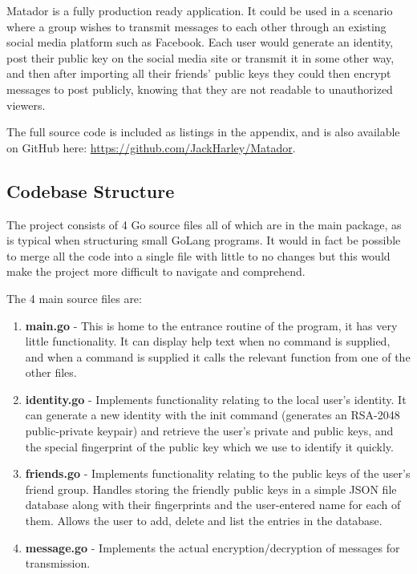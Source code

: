 \documentclass{article}[12pt]
\begin{document}
		Matador is a fully production ready application. It could be used in a scenario where a group wishes to transmit messages to each other through an existing social media platform such as Facebook. Each user would generate an identity, post their public key on the social media site or transmit it in some other way, and then after importing all their friends' public keys they could then encrypt messages to post publicly, knowing that they are not readable to unauthorized viewers.
		
		The full source code is included as listings in the appendix, and is also available on GitHub here: \url{https://github.com/JackHarley/Matador}.
	
	\newpage
	
	\subsection{Codebase Structure}
		The project consists of 4 Go source files all of which are in the main package, as is typical when structuring small GoLang programs. It would in fact be possible to merge all the code into a single file with little to no changes but this would make the project more difficult to navigate and comprehend.
		
		The 4 main source files are:
		
		\begin{enumerate}
			\item \textbf{main.go} - This is home to the entrance routine of the program, it has very little functionality. It can display help text when no command is supplied, and when a command is supplied it calls the relevant function from one of the other files.
			
			\item \textbf{identity.go} - Implements functionality relating to the local user's identity. It can generate a new identity with the init command (generates an RSA-2048 public-private keypair) and retrieve the user's private and public keys, and the special fingerprint of the public key which we use to identify it quickly.
			
			\item \textbf{friends.go} - Implements functionality relating to the public keys of the user's friend group. Handles storing the friendly public keys in a simple JSON file database along with their fingerprints and the user-entered name for each of them. Allows the user to add, delete and list the entries in the database.
			
			\item \textbf{message.go} - Implements the actual encryption/decryption of messages for transmission.
		\end{enumerate}
	
\end{document}
